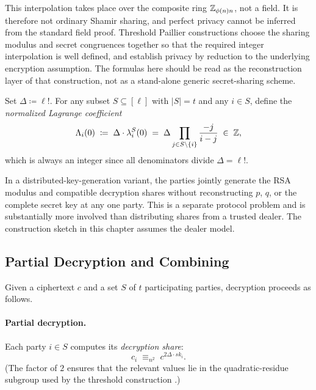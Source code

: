 \begin{remark}
This interpolation takes place over the composite ring $\mathbb{Z}_{\phi(n)n}$, not a field. It is therefore not ordinary Shamir sharing, and perfect privacy cannot be inferred from the standard field proof. Threshold Paillier constructions choose the sharing modulus and secret congruences together so that the required integer interpolation is well defined, and establish privacy by reduction to the underlying encryption assumption. The formulas here should be read as the reconstruction layer of that construction, not as a stand-alone generic secret-sharing scheme.
\end{remark}

Set $\Delta \coloneqq \ell!$. For any subset $S \subseteq [\ell]$ with $|S| = t$ and any
$i \in S$, define the \emph{normalized Lagrange coefficient}
\[
  \Lambda_i(0) \;\coloneqq\; \Delta \cdot \lambda_i^S(0)
  \;=\; \Delta \prod_{j \in S \setminus \{i\}} \frac{-j}{i-j} \;\in\; \mathbb{Z},
\]
which is always an integer since all denominators divide $\Delta = \ell!$.

\begin{remark}
\label{rem:dkg}
In a distributed-key-generation variant, the parties jointly generate the RSA modulus and compatible decryption shares without reconstructing $p$, $q$, or the complete secret key at any one party. This is a separate protocol problem and is substantially more involved than distributing shares from a trusted dealer. The construction sketch in this chapter assumes the dealer model.
\end{remark}

\subsection{Partial Decryption and Combining}

Given a ciphertext $c$ and a set $S$ of $t$ participating parties, decryption proceeds as
follows.

\paragraph{Partial decryption.}
Each party $i \in S$ computes its \emph{decryption share}:
\[
  c_i \;\equiv_{n^2}\; c^{2\Delta \cdot sk_i}.
\]
(The factor of $2$ ensures that the relevant values lie in the quadratic-residue subgroup used by the threshold construction \cite{DamgardJurik2001}.)

